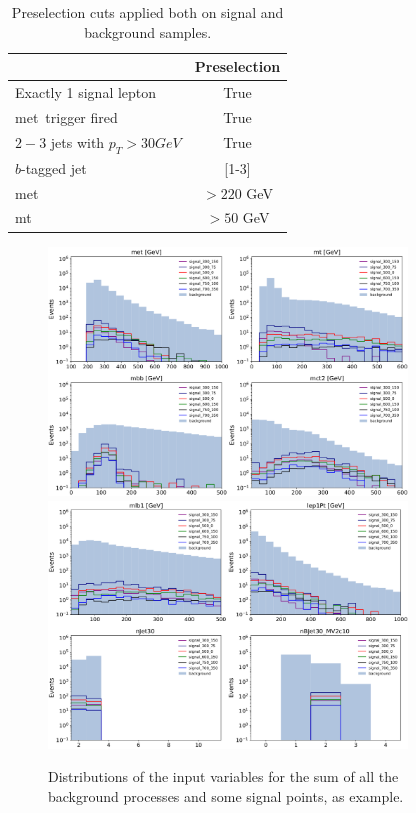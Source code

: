 \begin{table}[h]
\centering
\caption{Preselection cuts applied both on signal and background samples.}
\label{tab:preliminary_cuts}
\begin{tabular}{lc}
\hline
&Preselection \\
\hline
Exactly 1 signal lepton&True\\
met\ trigger fired&True\\
$2-3$ jets with $p_{T}>30 GeV$&True\\
$b$-tagged jet&[1-3]\\
met\ &$> 220$ GeV\\
mt\ &$> 50$ GeV\\
\hline
\end{tabular}
\end{table}

\begin{figure}
	\centering
  \includegraphics[width=0.85\textwidth]{figs/dataset/distr_1.png}
 \includegraphics[width=0.85\textwidth]{figs/dataset/distr_2.png}
  \caption{Distributions of the input variables for the sum of all the background processes and some signal points, as example.}
  \label{fig:feat_distr}
\end{figure}

